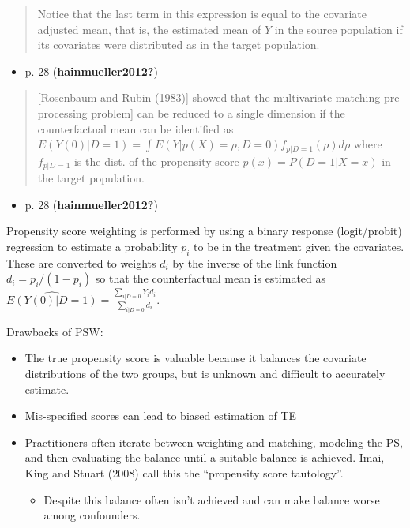 \documentclass[
  letterpaper,
  DIV=11,
  numbers=noendperiod]{scrartcl}
\providecommand{\tightlist}{%
  \setlength{\itemsep}{0pt}\setlength{\parskip}{0pt}}\usepackage{longtable,booktabs,array}
\begin{document}
\begin{quote}
Notice that the last term in this expression is equal to the covariate
adjusted mean, that is, the estimated mean of \(Y\) in the source
population if its covariates were distributed as in the target
population.
\end{quote}

\begin{itemize}
\tightlist
\item
  p. 28 (\textbf{hainmueller2012?})
\end{itemize}

\begin{quote}
{[}Rosenbaum and Rubin (1983){]} showed that the multivariate matching
pre-processing problem{]} can be reduced to a single dimension if the
counterfactual mean can be identified as
\(E(Y(0)|D=1) = \int E(Y|p(X) = \rho, D=0) f_{p|D=1}(\rho)d\rho\) where
\(f_{p|D=1}\) is the dist. of the propensity score
\(p(x) = P(D=1 | X=x)\) in the target population.
\end{quote}

\begin{itemize}
\tightlist
\item
  p. 28 (\textbf{hainmueller2012?})
\end{itemize}

Propensity score weighting is performed by using a binary response
(logit/probit) regression to estimate a probability \(p_i\) to be in the
treatment given the covariates. These are converted to weights \(d_i\)
by the inverse of the link function \(d_i = p_i / (1-p_i)\) so that the
counterfactual mean is estimated as
\(\widehat{E(Y(0)|D=1)} = \frac{\sum_{i|D=0}Y_i d_i}{\sum_{i|D=0}d_i}.\)

Drawbacks of PSW:

\begin{itemize}
\item
  The true propensity score is valuable because it balances the
  covariate distributions of the two groups, but is unknown and
  difficult to accurately estimate.
\item
  Mis-specified scores can lead to biased estimation of TE
\item
  Practitioners often iterate between weighting and matching, modeling
  the PS, and then evaluating the balance until a suitable balance is
  achieved. Imai, King and Stuart (2008) call this the ``propensity
  score tautology''.

  \begin{itemize}
  \tightlist
  \item
    Despite this balance often isn't achieved and can make balance worse
    among confounders.
  \end{itemize}
\end{itemize}
\end{document}
